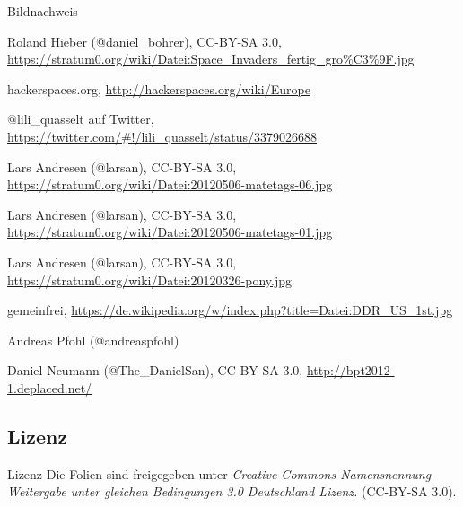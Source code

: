 \documentclass[hyperref={pdfpagelabels=false}]{beamer}
\begin{document}
\begin{frame}{Bildnachweis}
    \footnotesize
    \begin{description}[Folie XX]
        \item[Folie \ref{secinvaders}] Roland Hieber (@daniel\_bohrer), CC-BY-SA 3.0, {\tiny \url{https://stratum0.org/wiki/Datei:Space\_Invaders\_fertig\_gro\%C3\%9F.jpg}}
        \item[Folie \ref{secmap}] hackerspaces.org, {\tiny \url{http://hackerspaces.org/wiki/Europe}}
        \item[Folie \ref{secgeschichte}] @lili\_quasselt auf Twitter,
            {\tiny \url{https://twitter.com/\#!/lili\_quasselt/status/3379026688}}
        \item[Folie \ref{secreprap}] Lars Andresen (@larsan), CC-BY-SA 3.0, {\tiny \url{https://stratum0.org/wiki/Datei:20120506-matetags-06.jpg}}
        \item[Folie \ref{secmatetags}] Lars Andresen (@larsan), CC-BY-SA 3.0, {\tiny \url{https://stratum0.org/wiki/Datei:20120506-matetags-01.jpg}}
        \item[Folie \ref{secpony}] Lars Andresen (@larsan), CC-BY-SA 3.0, {\tiny \url{https://stratum0.org/wiki/Datei:20120326-pony.jpg}}
        \item[Folie \ref{secddr}] gemeinfrei, {\tiny \url{https://de.wikipedia.org/w/index.php?title=Datei:DDR\_US\_1st.jpg}}
        \item[Folie \ref{secgruendung}] Andreas Pfohl (@andreaspfohl)
        \item[Folie \ref{secbaellebad}] Daniel Neumann (@The\_DanielSan), CC-BY-SA 3.0, {\tiny \url{http://bpt2012-1.deplaced.net/}}
    \end{description}
    \normalsize
\end{frame}

\subsection{Lizenz}

\begin{frame}{Lizenz}
    Die Folien sind freigegeben unter \emph{Creative Commons
    Namensnennung-Weitergabe unter gleichen Bedingungen 3.0 Deutschland
    Lizenz.} (CC-BY-SA 3.0).
\end{frame}
\end{document}

